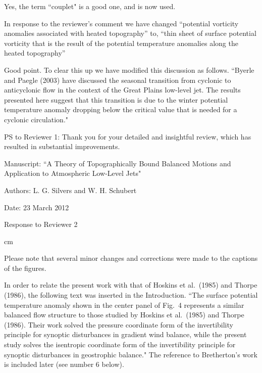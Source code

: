 \documentclass[11pt]{article}
\begin{document}
\medskip
{}  Yes, the term ``couplet" is a good one, and is now used. 

\medskip
{} In response to the reviewer's comment we have changed  
``potential vorticity anomalies associated with heated topography'' 
to, ``thin sheet of surface potential vorticity that is the result of the potential temperature anomalies 
along the heated topography''

\medskip
{} Good point. To clear this up we have modified this 
discussion as follows. ``Byerle and Paegle (2003) have discussed the seasonal 
transition from cyclonic to anticyclonic flow in the context of the Great Plains 
low-level jet.  The results presented here suggest that this transition 
is due to the winter potential temperature anomaly dropping below the 
critical value that is needed for a cyclonic circulation."
   

\bigskip
\bigskip

\noindent PS to Reviewer 1: Thank you for your detailed and insightful review, which has resulted in 
substantial improvements.   





\newpage

\noindent Manuscript: ``A Theory of Topographically Bound Balanced Motions and Application to Atmospheric Low-Level Jets"

\noindent Authors:  L. G. Silvers and W. H. Schubert  

\noindent Date:  23 March 2012

\bigskip

\centerline{Response to Reviewer 2}

 cm

\bigskip
{}

Please note that several minor changes and corrections were made to the captions of the figures.  

\medskip
{} In order to relate the present work with that of Hoskins et al.~(1985) 
and Thorpe (1986), the following text was inserted in the 
Introduction. ``The surface potential 
temperature anomaly shown in the center panel of Fig.~4 represents 
a similar balanced flow structure to those studied by Hoskins et al.~(1985) 
and Thorpe (1986). Their work solved the pressure coordinate form of the 
invertibility principle for synoptic disturbances in gradient wind balance, 
while the present study solves the isentropic coordinate form of the invertibility 
principle for synoptic disturbances in geostrophic balance."  The reference to 
Bretherton's work is included later (see number 6 below). 
\end{document}
